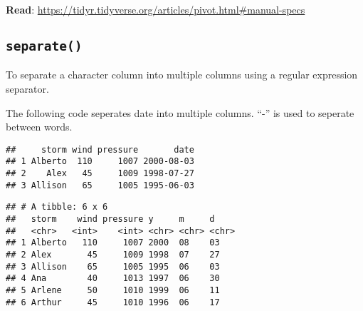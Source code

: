 \documentclass[]{article}
\newenvironment{Shaded}{\begin{snugshade}}{\end{snugshade}}
\newcommand{\CommentTok}[1]{\textcolor[rgb]{0.56,0.35,0.01}{\textit{#1}}}
\newcommand{\DataTypeTok}[1]{\textcolor[rgb]{0.13,0.29,0.53}{#1}}
\newcommand{\DecValTok}[1]{\textcolor[rgb]{0.00,0.00,0.81}{#1}}
\newcommand{\KeywordTok}[1]{\textcolor[rgb]{0.13,0.29,0.53}{\textbf{#1}}}
\newcommand{\NormalTok}[1]{#1}
\newcommand{\OperatorTok}[1]{\textcolor[rgb]{0.81,0.36,0.00}{\textbf{#1}}}
\newcommand{\StringTok}[1]{\textcolor[rgb]{0.31,0.60,0.02}{#1}}
\begin{document}
\textbf{Read}:
\url{https://tidyr.tidyverse.org/articles/pivot.html\#manual-specs}

\hypertarget{separate}{%
\subsection{\texorpdfstring{\texttt{separate()}}{separate()}}\label{separate}}

To separate a character column into multiple columns using a regular
expression separator.

The following code seperates date into multiple columns. ``-'' is used
to seperate between words.

\begin{Shaded}
\end{Shaded}

\begin{verbatim}
##     storm wind pressure       date
## 1 Alberto  110     1007 2000-08-03
## 2    Alex   45     1009 1998-07-27
## 3 Allison   65     1005 1995-06-03
\end{verbatim}

\begin{Shaded}
\end{Shaded}

\begin{verbatim}
## # A tibble: 6 x 6
##   storm    wind pressure y     m     d    
##   <chr>   <int>    <int> <chr> <chr> <chr>
## 1 Alberto   110     1007 2000  08    03   
## 2 Alex       45     1009 1998  07    27   
## 3 Allison    65     1005 1995  06    03   
## 4 Ana        40     1013 1997  06    30   
## 5 Arlene     50     1010 1999  06    11   
## 6 Arthur     45     1010 1996  06    17
\end{verbatim}
\end{document}

